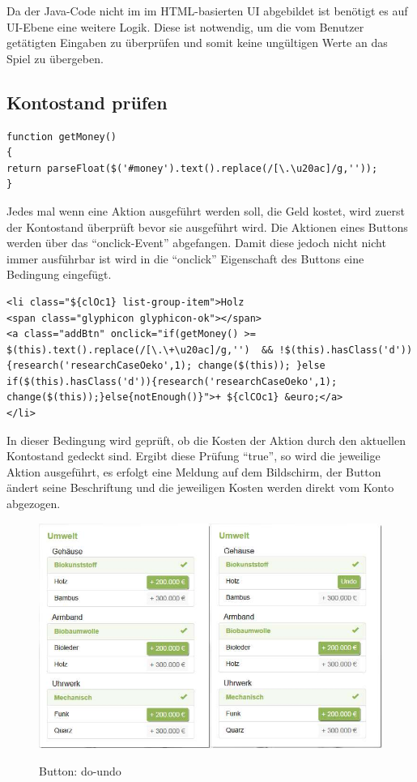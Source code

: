 Da der Java-Code nicht im im HTML-basierten UI abgebildet ist benötigt es auf UI-Ebene eine weitere Logik. Diese ist notwendig, um die vom Benutzer getätigten Eingaben zu überprüfen und somit keine ungültigen Werte an das Spiel zu übergeben. 

\subsection*{Kontostand prüfen}

\lstset{language=Java}
\begin{lstlisting}
function getMoney()
{
return parseFloat($('#money').text().replace(/[\.\u20ac]/g,''));
}
\end{lstlisting}

Jedes mal wenn eine Aktion ausgeführt werden soll, die Geld kostet, wird zuerst der Kontostand überprüft bevor sie ausgeführt wird. Die Aktionen eines Buttons werden über das \enquote{onclick-Event} abgefangen. Damit diese jedoch nicht nicht immer ausführbar ist wird in die \enquote{onclick} Eigenschaft des Buttons eine Bedingung eingefügt. 

\lstset{language=HTML}
\begin{lstlisting}
<li class="${clOc1} list-group-item">Holz 
<span class="glyphicon glyphicon-ok"></span>
<a class="addBtn" onclick="if(getMoney() >= $(this).text().replace(/[\.\+\u20ac]/g,'')  && !$(this).hasClass('d')){research('researchCaseOeko',1); change($(this)); }else if($(this).hasClass('d')){research('researchCaseOeko',1); change($(this));}else{notEnough()}">+ ${clCOc1} &euro;</a>
</li>
\end{lstlisting}

In dieser Bedingung wird geprüft, ob die Kosten der Aktion durch den aktuellen Kontostand gedeckt sind. Ergibt diese Prüfung \enquote{true}, so wird die jeweilige Aktion ausgeführt, es erfolgt eine Meldung auf dem Bildschirm, der Button ändert seine Beschriftung und die jeweiligen Kosten werden direkt vom Konto abgezogen.

\begin{figure} [H]
	\centering
	\includegraphics[scale=0.5]{img/button-do-undo.jpeg} 
	\label{fig:button-do-undo}
	\caption{Button: do-undo}
\end{figure}

